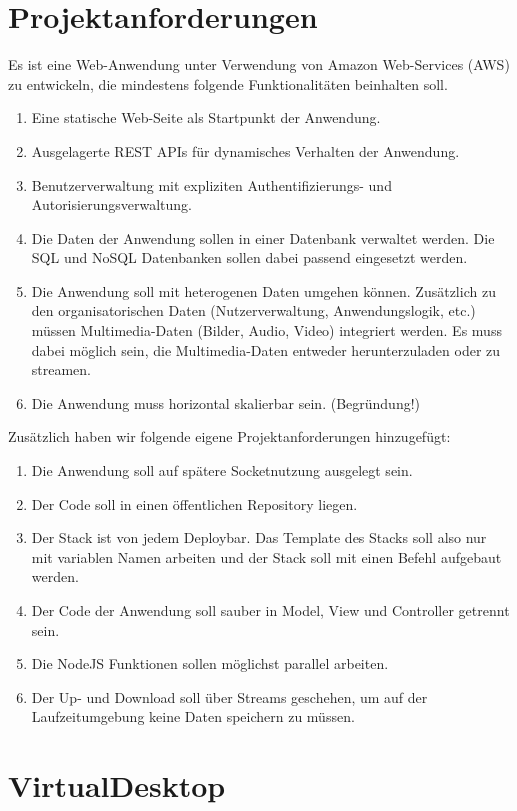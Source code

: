 \documentclass[a4paper, 12pt]{scrreprt}
\renewcommand\_{\textunderscore\allowbreak}
\begin{document}
\section{Projektanforderungen}
Es ist eine Web-Anwendung unter Verwendung von Amazon Web-Services (AWS) zu
entwickeln, die mindestens folgende Funktionalitäten beinhalten soll.
\begin{enumerate}
\item Eine statische Web-Seite als Startpunkt der Anwendung.
\item Ausgelagerte REST APIs für dynamisches Verhalten der Anwendung.
\item Benutzerverwaltung mit expliziten Authentifizierungs- und Autorisierungsverwaltung.
\item Die Daten der Anwendung sollen in einer Datenbank verwaltet werden. Die SQL und NoSQL Datenbanken sollen dabei passend eingesetzt werden.
\item Die Anwendung soll mit heterogenen Daten umgehen können. Zusätzlich zu den
organisatorischen Daten (Nutzerverwaltung, Anwendungslogik, etc.) müssen
Multimedia-Daten (Bilder, Audio, Video) integriert werden. Es muss dabei möglich
sein, die Multimedia-Daten entweder herunterzuladen oder zu streamen.
\item Die Anwendung muss horizontal skalierbar sein. (Begründung!)
\end{enumerate}
Zusätzlich haben wir folgende eigene Projektanforderungen hinzugefügt:
\begin{enumerate}
\item Die Anwendung soll auf spätere Socketnutzung ausgelegt sein.
\item Der Code soll in einen öffentlichen Repository liegen.
\item Der Stack ist von jedem Deploybar. Das Template des Stacks soll also nur mit variablen Namen arbeiten und der Stack soll mit einen Befehl aufgebaut werden.
\item Der Code der Anwendung soll sauber in Model, View und Controller getrennt sein. 
\item Die NodeJS Funktionen sollen möglichst parallel arbeiten.
\item Der Up- und Download soll über Streams geschehen, um auf der Laufzeitumgebung keine Daten speichern zu müssen.
\end{enumerate}

\section{VirtualDesktop}
\end{document}
